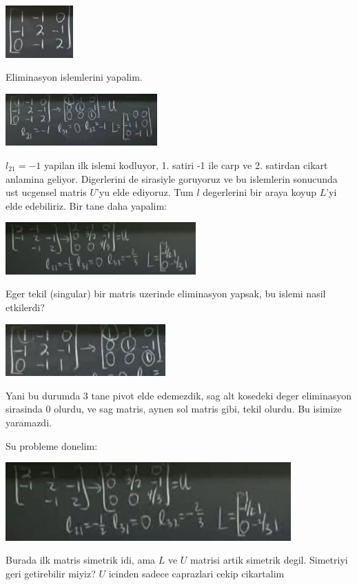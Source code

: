 \documentclass[12pt,fleqn]{article}\usepackage{../common}
\begin{document}
\includegraphics[height=2cm]{3_2.png}

Eliminasyon islemlerini yapalim. 

\includegraphics[height=2cm]{3_3.png}

$l_{21} = -1$ yapilan ilk islemi kodluyor, 1. satiri -1 ile carp ve
2. satirdan cikart anlamina geliyor. Digerlerini de sirasiyle goruyoruz ve
bu islemlerin sonucunda ust ucgensel matris $U$'yu elde ediyoruz. Tum $l$
degerlerini bir araya koyup $L$'yi elde edebiliriz. Bir tane daha yapalim:

\includegraphics[height=2cm]{3_4.png}

Eger tekil (singular) bir matris uzerinde eliminasyon yapsak, bu islemi
nasil etkilerdi? 

\includegraphics[height=2cm]{3_5.png}

Yani bu durumda 3 tane pivot elde edemezdik, sag alt kosedeki deger
eliminasyon sirasinda 0 olurdu, ve sag matris, aynen sol matris gibi, tekil
olurdu. Bu isimize yaramazdi. 

Su probleme donelim: 

\includegraphics[height=3cm]{3_4.png}

Burada ilk matris simetrik idi, ama $L$ ve $U$ matrisi artik simetrik
degil. Simetriyi geri getirebilir miyiz? $U$ icinden sadece caprazlari
cekip cikartalim
\end{document}
